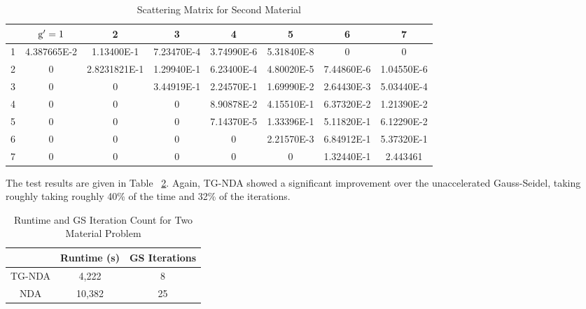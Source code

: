  \begin{table}[H]
\footnotesize
\centering
\caption{Scattering Matrix for Second Material}
\begin{center}
    \begin{tabular}{|c|c|c|c|c|c|c|c|}
\hline
 & $\mathrm{g}'=1$ & 2 & 3 & 4 & 5 & 6 & 7 \\ 
\hline
1 & 4.387665E-2 & 1.13400E-1   &  7.23470E-4 & 3.74990E-6 & 5.31840E-8  &     0    &     0    \\
\hline
2 & 0        &    2.8231821E-1  & 1.29940E-1 & 6.23400E-4 & 4.80020E-5 & 7.44860E-6 & 1.04550E-6 \\
\hline
3 & 0       &        0    &       3.44919E-1 & 2.24570E-1 & 1.69990E-2 & 2.64430E-3 & 5.03440E-4 \\
\hline
4 & 0         &      0      &         0     &  8.90878E-2 & 4.15510E-1 & 6.37320E-2 & 1.21390E-2 \\
\hline
5 & 0     &          0       &        0   &    7.14370E-5 & 1.33396E-1 & 5.11820E-1 & 6.12290E-2 \\
\hline
6 & 0   &        0      &         0   &        0     &  2.21570E-3 & 6.84912E-1 & 5.37320E-1 \\
\hline
7 & 0      &         0        &       0    &       0    &       0    &   1.32440E-1 & 2.443461  \\
\hline
    \end{tabular}
\end{center}
\label{table:mat2}
\end{table}


The test results are given in Table ~\ref{tab:two}. Again, TG-NDA showed a significant improvement over the unaccelerated Gauss-Seidel, taking roughly taking roughly 40\% of the time and 32\% of the iterations. 



\begin{table}[!htb]
\centering
\caption{Runtime and GS Iteration Count for Two Material Problem}
    \label{tab:two}
\begin{center}
    \begin{tabular}{|c|c|c|}
    \hline
    & Runtime (s) & GS Iterations \\
    \hline
    TG-NDA & 4,222 & 8 \\
    NDA & 10,382 & 25 \\
    \hline
    \end{tabular}
\end{center}
\end{table}

